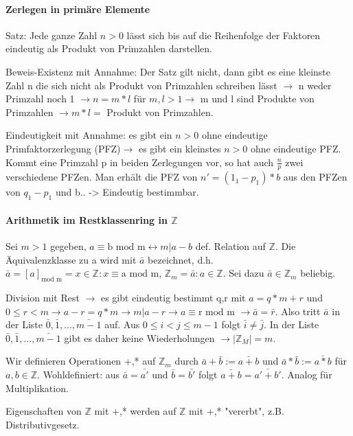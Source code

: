 \documentclass[10pt,landscape]{article}
\begin{document}
\begin{multicols}{3}
\paragraph{Zerlegen in primäre Elemente}
Satz: Jede ganze Zahl $n>0$ lässt sich bis auf die Reihenfolge der Faktoren eindeutig als Produkt von Primzahlen darstellen.

Beweis-Existenz mit Annahme: Der Satz gilt nicht, dann gibt es eine kleinste Zahl n die sich nicht als Produkt von Primzahlen schreiben lässt $\rightarrow$ n weder Primzahl noch 1 $\rightarrow n=m*l$ für $m,l>1 \rightarrow$ m und l sind Produkte von Primzahlen $\rightarrow m*l=$ Produkt von Primzahlen.

Eindeutigkeit mit Annahme: es gibt ein $n>0$ ohne eindeutige Primfaktorzerlegung (PFZ)$\rightarrow$ es gibt ein kleinstes $n>0$ ohne eindeutige PFZ. Kommt eine Primzahl p in beiden Zerlegungen vor, so hat auch $\frac{n}{p}$ zwei verschiedene PFZen. Man erhält die PFZ von $n'=(1_1-p_1)*b$ aus den PFZen von $q_1-p_1$ und b.. -> Eindeutig bestimmbar.

\paragraph{Arithmetik im Restklassenring in $\mathbb{Z}$}
Sei $m > 1$ gegeben, $a\equiv \text{b mod m} \leftrightarrow m|a-b$ def. Relation auf $\mathbb{Z}$. Die Äquivalenzklasse zu a wird mit $\bar{a}$ bezeichnet, d.h. $\bar{a}=[a]_{\text{mod m}}={x\in \mathbb{Z}: x\equiv \text{a mod m}}$, $\mathbb{Z}_m={\bar{a}:a\in \mathbb{Z}}$. Sei dazu $\bar{a}\in \mathbb{Z}_m$ beliebig.

Division mit Rest $\rightarrow$ es gibt eindeutig bestimmt q,r mit $a=q*m+r$ und $0\leq r < m \rightarrow a-r=q*m \rightarrow m| a-r \rightarrow a\equiv \text{r mod m } \rightarrow \bar{a}=\bar{r}$. Also tritt $\bar{a}$ in der Liste $\bar{0},\bar{1},...,\bar{m-1}$ auf. Aus $0\leq i < j \leq m-1$ folgt $\bar{i}\not=\bar{j}$. In der Liste $\bar{0},\bar{1},...,\bar{m-1}$ gibt es daher keine Wiederholungen $\rightarrow |\mathbb{Z}_M|=m$.

Wir definieren Operationen +,* auf $\mathbb{Z}_m$ durch $\bar{a}+\bar{b}:= \bar{a+b}$ und $\bar{a}*\bar{b}:=\bar{a*b}$ für $a,b\in \mathbb{Z}$. 
Wohldefiniert: aus $\bar{a}=\bar{a'}$ und $\bar{b}=\bar{b'}$ folgt $\bar{a+b}=\bar{a'+b'}$. Analog für Multiplikation.

Eigenschaften von $\mathbb{Z}$ mit +,* werden auf $\mathbb{Z}$ mit +,* "vererbt", z.B. Distributivgesetz.


\end{multicols}
\end{document}
